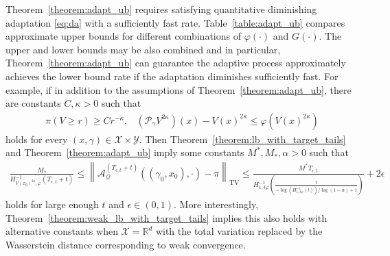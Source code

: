 \documentclass[12pt]{article}
\theoremstyle{plain}
\theoremstyle{remark}
\newcommand{\norm}[1]{\left\lVert#1\right\rVert}
\newcommand{\e}{\epsilon}
\newcommand{\R}{\mathbb{R}}
\newcommand{\Q}{\mathcal{Q}}
\renewcommand{\P}{\mathcal{P}}
\newcommand{\A}{\mathcal{A}}
\newcommand{\X}{\mathcal{X}}
\newcommand{\Y}{\mathcal{Y}}
\let\temp\phi
\let\phi\varphi
\let\varphi\temp
\begin{document}
Theorem~\ref{theorem:adapt_ub} requires satisfying quantitative diminishing adaptation \eqref{eq:da} with a sufficiently fast rate. 
Table~\ref{table:adapt_ub} compares approximate upper bounds for different combinations of $\phi(\cdot)$ and $G(\cdot)$.
The upper and lower bounds may be also combined and in particular, Theorem~\ref{theorem:adapt_ub} can guarantee the adaptive process approximately achieves the lower bound rate if the adaptation diminishes sufficiently fast.
For example, if in addition to the assumptions of Theorem~\ref{theorem:adapt_ub}, there are constants $C, \kappa > 0$ such that 
\begin{align*}
&\pi( V \ge r ) \ge C r^{-\kappa},
&(\P_\gamma V^{2\kappa})(x) - V(x)^{2\kappa}  \le \phi( V(x)^{2\kappa} )
\end{align*}
holds for every $(x, \gamma) \in  \X \times \Y$. Then Theorem~\ref{theorem:lb_with_target_tails} and Theorem~\ref{theorem:adapt_ub} imply some constants $M^*, M_*, \alpha > 0$ such that
\begin{align*}
\frac{M_*}{H_{V(x_0)^{2\kappa}, \phi}^{-1}(T_{\e, t} + t) }
\le \norm{ \A_{\Q}^{( T_{\e, t} + t )}((\gamma_0, x_0), \cdot) - \pi }_{\text{TV}}
\le \frac{M^* T_{\e, t}}{ H_{1, \delta \phi}^{-1}\left( \frac{t}{ -\log( H_{1, \delta \phi}^{-1}(t) )/\log(1-\alpha) + 1} \right) } + 2 \e
\end{align*}
holds for large enough $t$ and $\e \in (0, 1)$. 
More interestingly, Theorem~\ref{theorem:weak_lb_with_target_tails} implies this also holds with alternative constants when $\X = \R^d$ with the total variation replaced by the Wasserstein distance corresponding to weak convergence.

\end{document}
